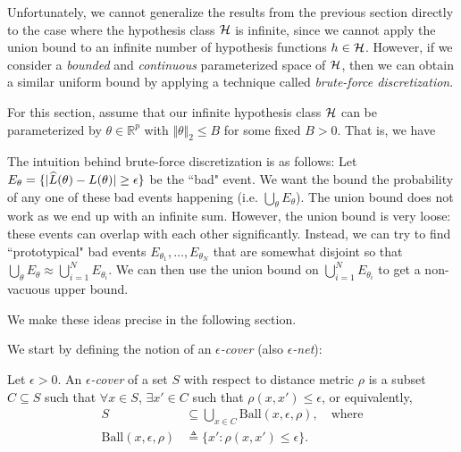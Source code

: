Unfortunately, we cannot generalize the results from the previous section directly to the case where the hypothesis class $\mathcal H$ is infinite, since we cannot apply the union bound to an infinite number of hypothesis functions $h \in \mathcal H$. However, if we consider a \emph{bounded} and \emph{continuous} parameterized space of $\mathcal H$, then we can obtain a similar uniform bound by applying a technique called \emph{brute-force discretization}.

For this section, assume that our infinite hypothesis class $\mathcal H$ can be parameterized by $\theta \in \mathbb{R}^p$ with $\Vert \theta \Vert_2 \leq B$ for some fixed $B > 0$. That is, we have 

The intuition behind brute-force discretization is as follows: Let $E_\theta = \{ |\widehat{L}(\theta) - L(\theta)| \geq \epsilon \}$ be the ``bad" event. We want the bound the probability of any one of these bad events happening (i.e. $\bigcup_\theta E_\theta$). The union bound does not work as we end up with an infinite sum. However, the union bound is very loose: these events can overlap with each other significantly. Instead, we can try to find ``prototypical" bad events $E_{\theta_1}, \dots, E_{\theta_N}$ that are somewhat disjoint so that $\bigcup_\theta E_\theta \approx \bigcup_{i=1}^N E_{\theta_i}$. We can then use the union bound on $\bigcup_{i=1}^N E_{\theta_i}$ to get a non-vacuous upper bound.

We make these ideas precise in the following section.


We start by defining the notion of an \emph{$\epsilon$-cover} (also \textit{$\epsilon$-net}):

\begin{definition}
Let $\epsilon>0$. An \emph{$\epsilon$-cover} of a set $S$ with respect to distance metric $\rho$ is a subset $C \subseteq S$ such that $\forall x \in S$, $\exists x' \in C$ such that $\rho(x,x') \le \epsilon$, or equivalently,
\begin{align}
S &\subseteq \bigcup_{x \in C} \mathrm{Ball}(x, \epsilon, \rho), \quad \text{where} \\
\mathrm{Ball}(x, \epsilon, \rho) &\triangleq \{ x': \rho(x, x') \leq \epsilon \}.
\end{align}
\end{definition}

